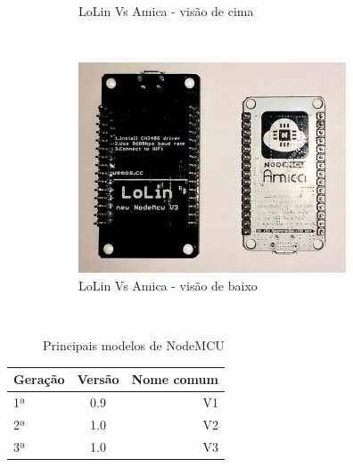 \documentclass{beamer}
\begin{document}
\begin{frame}
\begin{minipage}{\textwidth}
\begin{figure}
\begin{subfigure}[b]{0.25\textwidth}
			\caption{LoLin Vs Amica - visão de cima}
			\label{fig:arudfdsino_uno}
		\end{subfigure}
		~ %
		\begin{subfigure}[b]{0.25\textwidth}
			\includegraphics[width=\textwidth]{amica-vs-lolin-2.png}
			\caption{LoLin Vs Amica - visão de baixo}
			\label{fig:nodesdf_mcu}
		\end{subfigure}
		~ %
		\caption{Principais modelos de NodeMCU}\label{fig:pfsdlaca_iot}
		\vspace{-20pt}
	\end{figure}
	
	\begin{center}
		\begin{tabular}{l|c|r}
			Geração & Versão & Nome comum \\
			\hline
			1ª & 0.9 & V1 \\
			\hline
			2ª & 1.0 & V2 \\
			\hline
			3ª & 1.0 & V3 \\
		\end{tabular}	
	\end{center} \cite{versoes_nodemcu}

\end{minipage}
\end{frame} 
\end{document}
